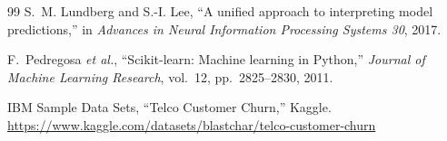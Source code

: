 \begin{thebibliography}{99}
S.~M. Lundberg and S.-I. Lee,
``A unified approach to interpreting model predictions,''
in \textit{Advances in Neural Information Processing Systems 30}, 2017.

F.~Pedregosa \textit{et al.},
``Scikit-learn: Machine learning in Python,''
\textit{Journal of Machine Learning Research}, vol.~12, pp.~2825--2830, 2011.

IBM Sample Data Sets, ``Telco Customer Churn,'' Kaggle.
\url{https://www.kaggle.com/datasets/blastchar/telco-customer-churn}

\end{thebibliography}

